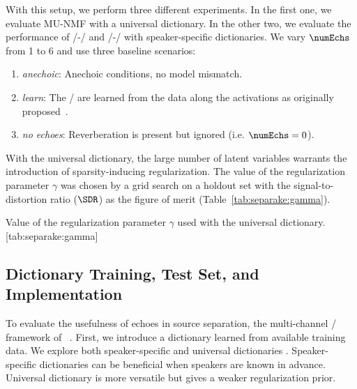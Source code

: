 \mynewline
With this setup, we perform three different experiments.
In the first one, we evaluate MU-NMF with a universal dictionary.
In the other two, we evaluate the performance of \MU/-\NMF/ and \EM/-\NMF/ with speaker-specific dictionaries.
We vary $\numEchs$ from 1 to 6 and use three baseline scenarios:
\begin{enumerate}
\item \textit{anechoic}: Anechoic conditions, no model mismatch.
\item \textit{learn}: The \RTFs/ are learned from the data along the activations as originally proposed~.
\item \textit{no echoes}: Reverberation is present but ignored (i.e. $\numEchs=0$).
\end{enumerate}
With the universal dictionary, the large number of latent variables warrants the introduction of sparsity-inducing regularization.
The value of the regularization parameter $\gamma$ was chosen by a grid search on a holdout set with the signal-to-distortion ratio ($\SDR$) as the figure of merit  (Table~\cref{tab:separake:gamma}).

\begin{table}
    \begin{sidecaption}[]{
        Value of the regularization parameter $\gamma$ used with the universal dictionary.
        }[tab:separake:gamma]
        \centering
        \small
        
    \end{sidecaption}
\end{table}


\subsection{Dictionary Training, Test Set, and Implementation}
To evaluate the usefulness of echoes in source separation, the multi-channel \NMF/ framework of \citeauthor{ozerov2010multichannel}~.
First, we introduce a dictionary learned from available training data.
We explore both speaker-specific and universal dictionaries .
Speaker-specific dictionaries can be beneficial when speakers are known in advance.
Universal dictionary is more versatile but gives a weaker regularization prior.

\begin{figure}[h]
    \begin{fullwidth}
    \centering
        \hfill
    \label{fig:separake:results}
    \end{fullwidth}
\end{figure}


